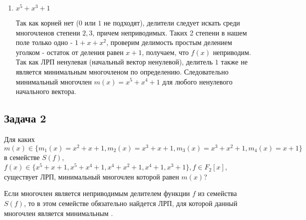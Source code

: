 \documentclass[utf8x, 14pt]{G7-32} %
\begin{document}
\begin{enumerate}
    \item $ x^5+x^3+1$
    
    Так как корней нет ($0$ или $1$ не подходят), делители следует искать среди многочленов степени $2,3$, причем неприводимых. Таких 2 степени в нашем поле только одно - $1 + x + x^2$, проверим делимость простым делением уголком - остаток от деления равен $x+1$, получаем, что $f(x)$ неприводим. Так как ЛРП ненулевая (начальный вектор ненулевой), делитель $1$ также не является минимальным многочленом по определению. Следовательно минимальный многочлен $m(x) = x^5+x^4+1$ для любого ненулевого начального вектора.    

    
\end{enumerate}

\subsection{Задача 2}
Для каких $m(x)\in\{m_1(x)=x^2+x+1, m_2(x)=x^3+x+1, m_3(x)=x^3+x^2+1, m_4(x)=x+1\}$ в семействе $S(f)$, $f(x)\in \{x^5+x+1, x^5+x^4+1, x^4+x^2+1, x^4+1, x^3+1\}, f\in F_2[x]$, существует ЛРП, минимальный многочлен которой равен $m(x)$?

Если многочлен является неприводимым делителем функции $f$ из семейства $S(f)$, то в этом семействе обязательно найдется ЛРП, для которой данный многочлен является минимальным \cite{hse:Teoria_Gener}. 
\end{document}

